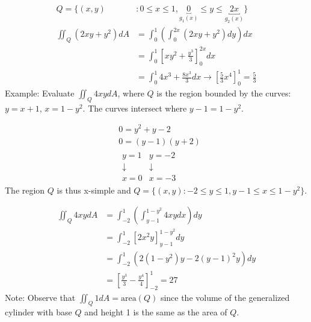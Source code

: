 \documentclass{article}
\newcommand{\nn}{\leavevmode \newline \newline} %
\numberwithin{equation}{subsection} %
\begin{document}
\begin{equation}
    \begin{split}
        Q = \{ (x,y) &: 0 \leq x \leq 1 , \underbracket{0}_{g_1(x)} \leq y \leq \underbracket{2x}_{g_2(x)} \} \\
        \iint_Q (2xy+y^2)dA &= \int_0^1 \left( \int_0^{2x} (2xy+y^2)dy\right)dx \\
        &= \int_0^1 \left[ xy^2+\frac{y^3}{3}\right]_0^{2x}dx \\
        &=\int_0^1 4x^3 + \frac{8x^3}{3}dx \to \left[ \frac{5}{3}x^4\right]_0^1 = \frac{5}{3}
    \end{split}
\end{equation}
\nn
Example: Evaluate $\iint_Q 4xydA$, where $Q$ is the region bounded by the curves: $y=x+1$, $x=1-y^2$. The curves intersect where $y-1=1-y^2$.

\begin{equation}
    \begin{split}
        &0=y^2+y-2 \\
        &0=(y-1)(y+2) \\
        &\begin{array}{cc}
            y = 1 & y= -2 \\
            \downarrow & \downarrow \\
            x=0 & x=-3
        \end{array}
    \end{split}
\end{equation}
The region $Q$ is thus x-simple and $Q=\{(x,y): -2 \leq y \leq 1, y-1 \leq x \leq 1-y^2 \}$.

\begin{equation}
    \begin{split}
        \iint_Q 4xydA &= \int_{-2}^1 \left( \int_{y-1}^{1-y^2} 4xydx\right)dy \\
        &= \int_{-2}^1 \left[ 2x^2y \right]_{y-1}^{1-y^2} dy \\
        &= \int_{-2}^1 (2(1-y^2)y - 2(y-1)^2y) dy \\
        &= \left[ \frac{y^3}{3} - \frac{y^4}{4}\right]_{-2}^1 = 27
    \end{split}
\end{equation}
Note: Observe that $\iint_Q 1 dA = \text{area}(Q)$ since the volume of the generalized cylinder with base $Q$ and height 1 is the same as the area of $Q$.
\end{document}
